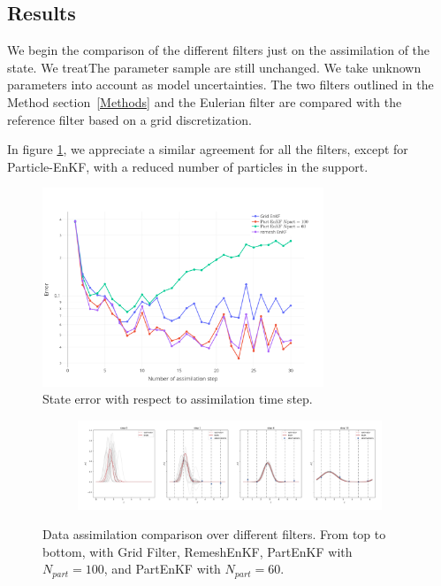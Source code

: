 \subsection{Results}

We begin the comparison of the different filters just on the assimilation of the state. We treatThe parameter sample are still unchanged. We take unknown parameters into account as model uncertainties. The two filters outlined in the Method section~\ref{Methods} and the Eulerian filter are compared with the reference filter based on a grid discretization.

In figure \ref{fig:1d_error_time}, we appreciate a similar agreement for all the filters, except for Particle-EnKF, with a reduced number of particles in the support.

\begin{figure}
	\centering
	\includegraphics[width=0.75\textwidth]{images/app1d/wo_calibration/state_error.png}
	\caption{State error with respect to assimilation time step.}
	\label{fig:1d_error_time}
\end{figure}

\begin{figure}
	\centering
	\begin{subfigure}{\textwidth}
		\includegraphics[width=\textwidth]{images/app1d/wo_calibration/remesh_EnKF.png}
	\end{subfigure}
	\caption{Data assimilation comparison over different filters. From top to bottom, with Grid Filter, RemeshEnKF, PartEnKF with $N_{part}=100$, and PartEnKF with $N_{part}=60$.}
\end{figure}
\newpage

